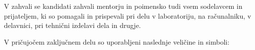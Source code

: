 \documentclass[a4paper,twoside,openright,12pt]{book}
\date{Ljubljana, 2016}
\begin{document}
\graphicspath{{./slike/}}
\frontmatter
%

\maketitle


\zahvala V zahvali se kandidati zahvali mentorju in poimensko tudi
vsem sodelavcem in prijateljem, ki so pomagali in prispevali pri
delu v laboratoriju, na računalniku, v delavnici, pri tehnični
izdelavi dela in drugje.








\tableofcontents

\seznamslik
\seznamtabel


\seznamsimbolov

V pričujočem zaključnem delu so uporabljeni naslednje veličine in
simboli:
\end{document}
